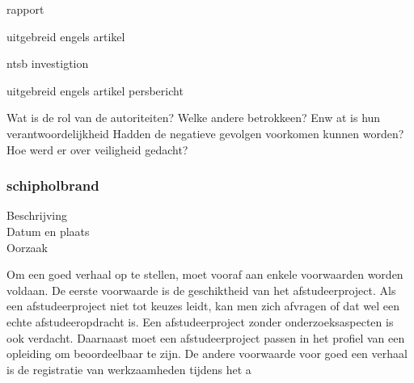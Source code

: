 {{\cite{aviationReport}
rapport

\cite{aviationSLMCrashAccidentInvestigation}

\cite{mcDonnelDouglasCommissionReportSLMCrash}

\cite{wikiSRFlight764}

\cite{}

\cite{nos07062019SLMTerugblik}

\cite{dagvantoenSLMCrash}

\cite{waterkantNesty07061989}
uitgebreid engels artikel

\cite{eduNandlalSRCrash}
ntsb investigtion

\cite{oldjetsSRAirways}
uitgebreid engels artikel
\cite{cloudberg02012021srflight764}
persbericht

\cite{apnews07061989srplanecrash}
Wat is de rol van de autoriteiten?
Welke andere betrokkeen? Enw at is hun verantwoordelijkheid
Hadden de negatieve gevolgen voorkomen kunnen worden?
Hoe werd er over veiligheid gedacht?



\subsubsection{schipholbrand}

\begin{description}
	\item[Beschrijving]
	\item[Datum en plaats] 
	\item[Oorzaak]
\end{description}
Om een goed verhaal op te stellen, moet vooraf aan enkele voorwaarden
worden voldaan. De eerste voorwaarde is de geschiktheid van het
afstudeerproject. Als een afstudeerproject niet tot keuzes leidt, kan
men zich afvragen of dat wel een echte afstudeeropdracht is. Een
afstudeerproject zonder onderzoeksaspecten is ook verdacht. Daarnaast
moet een afstudeerproject passen in het profiel van een opleiding om
beoordeelbaar te zijn. De andere voorwaarde voor goed een verhaal is
de registratie van werkzaamheden tijdens het a


}}
